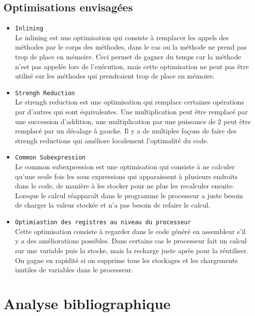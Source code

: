 \documentclass[a4paper]{article}
\begin{document}
\subsection{Optimisations envisagées}
\begin{itemize}
\item \texttt{Inlining} \\
Le inlining est une optimisation qui consiste à remplacer les appels des méthodes par le corps des méthodes, dans le cas ou la méthode ne prend pas trop de place en mémoire. Ceci permet de gagner du temps car la méthode n'est pas appelée lors de l'exécution, mais cette optimisation ne peut pas être utilisé sur les méthodes qui prendraient trop de place en mémoire.
\item \texttt{Strengh Reduction} \\
Le strengh reduction est une optimisation qui remplace certaines opérations par d'autres qui sont équivalentes. Une multiplication peut être remplacé par une succession d'addition, une multiplication par une puissance de 2 peut être remplacé par un décalage à gauche. Il y a de multiples façons de faire des strengh reductions qui améliore localement l'optimalité du code.
\item \texttt{Common Subexpression} \\
Le common subexpression est une optimisation qui consiste à ne calculer qu'une seule fois les sous expressions qui apparaissent à plusieurs endroits dans le code, de manière à les stocker pour ne plus les recalculer ensuite. Lorsque le calcul réapparaît dans le programme le processeur a juste besoin de charger la valeur stockée et n'a pas besoin de refaire le calcul.
\item \texttt{Optimiastion des registres au niveau du processeur} \\
Cette optimisation consiste à regarder dans le code généré en assembleur s'il y a des améliorations possibles. Dans certains cas le processeur fait un calcul sur une variable puis la stocke, mais la recharge juste après pour la réutiliser. On gagne en rapidité si on supprime tous les stockages et les chargements inutiles de variables dans le processeur. 
     \end{itemize}
\section{Analyse bibliographique}
\end{document}
